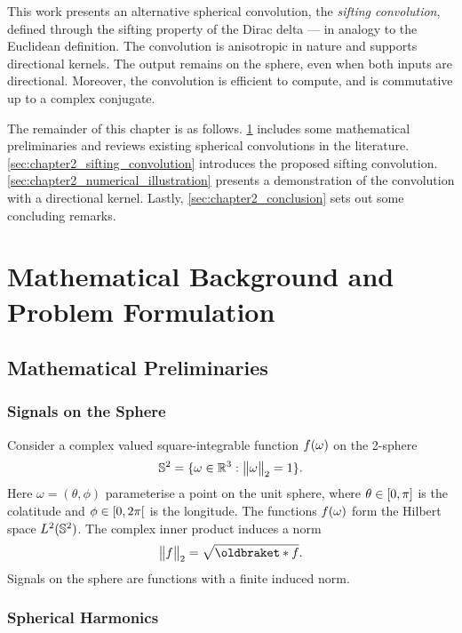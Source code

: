 This work presents an alternative spherical convolution, the \emph{sifting convolution}, defined through the sifting property of the Dirac delta --- in analogy to the Euclidean definition.
The convolution is anisotropic in nature and supports directional kernels.
The output remains on the sphere, even when both inputs are directional.
Moreover, the convolution is efficient to compute, and is commutative up to a complex conjugate.

The remainder of this chapter is as follows.
\cref{sec:chapter2_preliminaries} includes some mathematical preliminaries and reviews existing spherical convolutions in the literature.
\cref{sec:chapter2_sifting_convolution} introduces the proposed sifting convolution.
\cref{sec:chapter2_numerical_illustration} presents a demonstration of the convolution with a directional kernel.
Lastly, \cref{sec:chapter2_conclusion} sets out some concluding remarks.

\section{Mathematical Background and Problem Formulation}\label{sec:chapter2_preliminaries}

\subsection{Mathematical Preliminaries}

\subsubsection{Signals on the Sphere}

Consider a complex valued square-integrable function \(f(\omega)\) on the 2-sphere
%
\begin{equation}
	\mathbb{S}^{2}{}
	= \{\omega \in \mathbb{R}^{3} : {\big\lVert\omega\big\rVert}_{2} = 1\}.
\end{equation}
%
Here \(\omega=(\theta,\phi)\) parameterise a point on the unit sphere, where \(\theta \in \interval{0}{\pi}\) is the colatitude and \(\phi \in \interval[open right]{0}{2\pi}\) is the longitude.
The functions \(f(\omega)\) form the Hilbert space \(L^{2}(\mathbb{S}^{2})\).
The complex inner product induces a norm
%
\begin{equation}
	\norm{f}
	= \sqrt{\braket{f}}.
\end{equation}
%
Signals on the sphere are functions with a finite induced norm.

\subsubsection{Spherical Harmonics}

